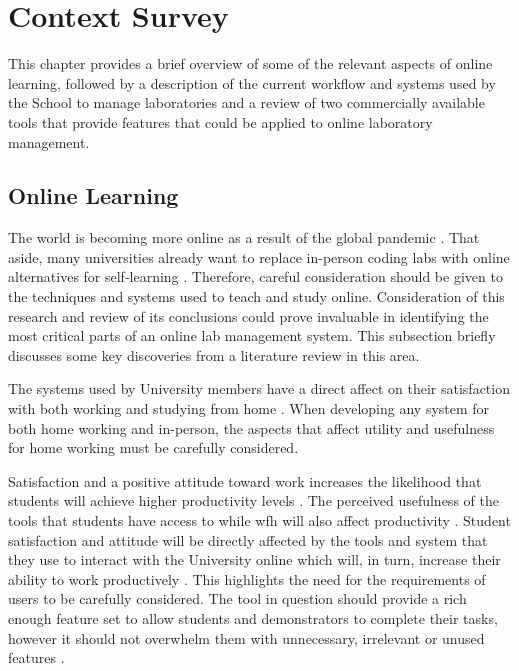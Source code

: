 \chapter{Context Survey} \label{chap:context}

This chapter provides a brief overview of some of the relevant aspects of online learning, followed by a description of the current workflow and systems used by the School to manage laboratories and a review of two commercially available tools that provide features that could be applied to online laboratory management.

\section{Online Learning}

The world is becoming more online as a result of the global pandemic \cite{bbcinternet} \cite{ofcominternet}. That aside, many universities already want to replace in-person coding labs with online alternatives for self‐learning \cite{olsson}. Therefore, careful consideration should be given to the techniques and systems used to teach and study online. Consideration of this research and review of its conclusions could prove invaluable in identifying the most critical parts of an online lab management system. This subsection briefly discusses some key discoveries from a literature review in this area.

The systems used by University members have a direct affect on their satisfaction with both working and studying from home \cite{tenney}. When developing any system for both home working and in-person, the aspects that affect utility and usefulness for home working must be carefully considered.

Satisfaction and a positive attitude toward work increases the likelihood that students will achieve higher productivity levels \cite{tenney}. The perceived usefulness of the tools that students have access to while \gls{wfh} will also affect productivity \cite{venka}. Student satisfaction and attitude will be directly affected by the tools and system that they use to interact with the University online which will, in turn, increase their ability to work productively \cite{safaa}. This highlights the need for the requirements of users to be carefully considered. The tool in question should provide a rich enough feature set to allow students and demonstrators to complete their tasks, however it should not overwhelm them with unnecessary, irrelevant or unused features \cite{ffatigue}. 

